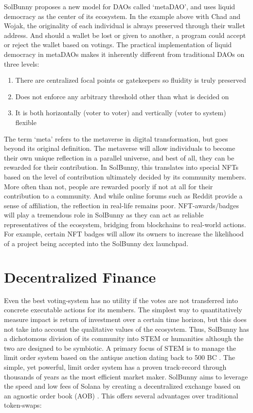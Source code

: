 \documentclass[12pt]{article}
\begin{document}
SolBunny proposes a new model for DAOs called ‘metaDAO’, and uses liquid democracy as the center of its ecosystem. In the example above with Chad and Wojak, the originality of each individual is always preserved through their wallet address. And should a wallet be lost or given to another, a program could accept or reject the wallet based on votings. The practical implementation of liquid democracy in metaDAOs makes it inherently different from traditional DAOs on three levels:

\begin{enumerate}

\item There are centralized focal points or gatekeepers so fluidity is truly preserved

\item Does not enforce any arbitrary threshold other than what is decided on

\item It is both horizontally (voter to voter) and vertically (voter to system) flexible

\end{enumerate}

The term ‘meta’ refers to the metaverse \cite{metaverse} in digital transformation, but goes beyond its original definition. The metaverse will allow individuals to become their own unique reflection in a parallel universe, and best of all, they can be rewarded for their contribution. In SolBunny, this translates into special NFTs based on the level of contribution ultimately decided by its community members. More often than not, people are rewarded poorly if not at all for their contribution to a community. And while online forums such as Reddit \cite{reddit} provide a sense of affiliation, the reflection in real-life remains poor. NFT-awards/badges will play a tremendous role in SolBunny as they can act as reliable representatives of the ecosystem, bridging from blockchains to real-world actions. For example, certain NFT badges will allow its owners to increase the likelihood of a project being accepted into the SolBunny dex launchpad.

\section*{Decentralized Finance}

Even the best voting-system has no utility if the votes are not transferred into concrete executable actions for its members. The simplest way to quantitatively measure impact is return of investment over a certain time horizon, but this does not take into account the qualitative values of the ecosystem. Thus, SolBunny has a dichotomous division of its community into STEM or humanities although the two are designed to be symbiotic. A primary focus of STEM is to manage the limit order system based on the antique auction dating back to 500 BC \cite{auction}. The simple, yet powerful, limit order system has a proven track-record through thousands of years as the most efficient market maker. SolBunny aims to leverage the speed and low fees of Solana by creating a decentralized exchange based on an agnostic order book (AOB) \cite{aob}. This offers several advantages over traditional token-swaps:
\end{document}
